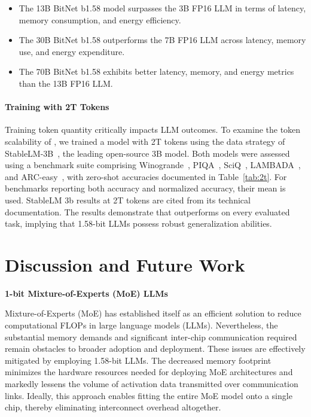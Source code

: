 \begin{itemize}
    \item The 13B BitNet b1.58 model surpasses the 3B FP16 LLM in terms of latency, memory consumption, and energy efficiency.
    \item The 30B BitNet b1.58 outperforms the 7B FP16 LLM across latency, memory use, and energy expenditure.
    \item The 70B BitNet b1.58 exhibits better latency, memory, and energy metrics than the 13B FP16 LLM.
\end{itemize}

\paragraph{Training with 2T Tokens}

Training token quantity critically impacts LLM outcomes. To examine the token scalability of , we trained a model with 2T tokens using the data strategy of StableLM-3B~\cite{StableLM-3B-4E1T}, the leading open-source 3B model. Both models were assessed using a benchmark suite comprising Winogrande~\cite{winoGrande}, PIQA~\cite{piqa}, SciQ~\cite{sciq}, LAMBADA~\cite{lambada}, and ARC-easy~\cite{arc}, with zero-shot accuracies documented in Table~\ref{tab:2t}. For benchmarks reporting both accuracy and normalized accuracy, their mean is used. StableLM 3b results at 2T tokens are cited from its technical documentation. The results demonstrate that  outperforms on every evaluated task, implying that 1.58-bit LLMs possess robust generalization abilities.

\section{Discussion and Future Work}

\textbf{1-bit Mixture-of-Experts (MoE) LLMs}

Mixture-of-Experts (MoE) has established itself as an efficient solution to reduce computational FLOPs in large language models (LLMs). Nevertheless, the substantial memory demands and significant inter-chip communication required remain obstacles to broader adoption and deployment. These issues are effectively mitigated by employing 1.58-bit LLMs. The decreased memory footprint minimizes the hardware resources needed for deploying MoE architectures and markedly lessens the volume of activation data transmitted over communication links. Ideally, this approach enables fitting the entire MoE model onto a single chip, thereby eliminating interconnect overhead altogether.

